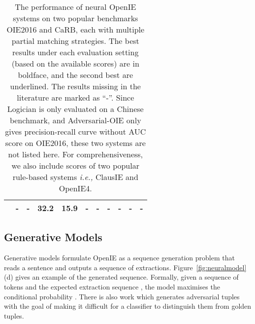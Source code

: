 \documentclass{article}
\newcommand{\ie}{\emph{i.e.,}\xspace}
\begin{document}
\begin{table*}[th]
\begin{tabular}{l | c c | c c |c c | c c| c c}
    \cite{tang-etal-2020-syntactic} & - & - & \textbf{32.2} & \textbf{15.9} & - & - & - & - & - & - \\
    \bottomrule
  \end{tabular}
  \caption{The performance of neural OpenIE systems on two popular benchmarks OIE2016 and CaRB, each with multiple partial matching strategies. The best results under each evaluation setting (based on the available scores) are in boldface, and the second best are underlined. The results missing in the literature are marked as ``-''. Since Logician is only evaluated on a Chinese benchmark, and Adversarial-OIE only gives precision-recall curve without AUC score on OIE2016, these two systems are not listed here. For comprehensiveness, we also include scores of two popular rule-based systems \ie ClausIE and OpenIE4.}
  \label{tab:eval}
  \vspace{-1em}
\end{table*}

\subsection{Generative Models}
Generative models formulate OpenIE as a sequence generation problem that reads a sentence and outputs a sequence of extractions.
Figure~\ref{fig:neuralmodel}(d) gives an example of the generated sequence.
Formally, given a sequence of tokens  and the expected extraction sequence , the model maximises the conditional probability . There is also work which generates adversarial tuples with the goal of making it difficult for a classifier to distinguish them from  golden tuples.
\end{document}
